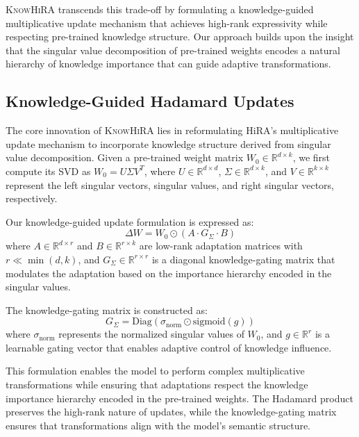 \documentclass[10pt,letterpaper]{article}
\begin{document}
\textsc{KnowHiRA} transcends this trade-off by formulating a knowledge-guided multiplicative update mechanism that achieves high-rank expressivity while respecting pre-trained knowledge structure. Our approach builds upon the insight that the singular value decomposition of pre-trained weights encodes a natural hierarchy of knowledge importance that can guide adaptive transformations.

\subsection{Knowledge-Guided Hadamard Updates}

The core innovation of \textsc{KnowHiRA} lies in reformulating HiRA's multiplicative update mechanism to incorporate knowledge structure derived from singular value decomposition. Given a pre-trained weight matrix $W_0 \in \mathbb{R}^{d \times k}$, we first compute its SVD as $W_0 = U\Sigma V^T$, where $U \in \mathbb{R}^{d \times d}$, $\Sigma \in \mathbb{R}^{d \times k}$, and $V \in \mathbb{R}^{k \times k}$ represent the left singular vectors, singular values, and right singular vectors, respectively.

Our knowledge-guided update formulation is expressed as:
\begin{equation}
\Delta W = W_0 \odot (A \cdot G_\Sigma \cdot B)
\end{equation}
where $A \in \mathbb{R}^{d \times r}$ and $B \in \mathbb{R}^{r \times k}$ are low-rank adaptation matrices with $r \ll \min(d,k)$, and $G_\Sigma \in \mathbb{R}^{r \times r}$ is a diagonal knowledge-gating matrix that modulates the adaptation based on the importance hierarchy encoded in the singular values.

The knowledge-gating matrix is constructed as:
\begin{equation}
G_\Sigma = \text{Diag}(\sigma_{\text{norm}} \odot \text{sigmoid}(g))
\end{equation}
where $\sigma_{\text{norm}}$ represents the normalized singular values of $W_0$, and $g \in \mathbb{R}^r$ is a learnable gating vector that enables adaptive control of knowledge influence.

This formulation enables the model to perform complex multiplicative transformations while ensuring that adaptations respect the knowledge importance hierarchy encoded in the pre-trained weights. The Hadamard product preserves the high-rank nature of updates, while the knowledge-gating matrix ensures that transformations align with the model's semantic structure.
\end{document}
